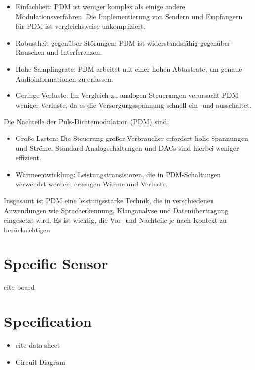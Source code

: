 \begin{itemize}
    \item Einfachheit: PDM ist weniger komplex als einige andere Modulationsverfahren. Die Implementierung von Sendern und Empfängern für PDM ist vergleichsweise unkompliziert.
    \item Robustheit gegenüber Störungen: PDM ist widerstandsfähig gegenüber Rauschen und Interferenzen.
    \item Hohe Samplingrate: PDM arbeitet mit einer hohen Abtastrate, um genaue Audioinformationen zu erfassen.
    \item Geringe Verluste: Im Vergleich zu analogen Steuerungen verursacht PDM weniger Verluste, da es die Versorgungsspannung schnell ein- und ausschaltet.
\end{itemize}

\bigskip

Die Nachteile der Puls-Dichtemodulation (PDM) sind:

\begin{itemize}
    \item Große Lasten: Die Steuerung großer Verbraucher erfordert hohe Spannungen und Ströme. Standard-Analogschaltungen und DACs sind hierbei weniger effizient.
    \item Wärmeentwicklung: Leistungstransistoren, die in PDM-Schaltungen verwendet werden, erzeugen Wärme und Verluste.
\end{itemize}

Insgesamt ist PDM eine leistungsstarke Technik, die in verschiedenen Anwendungen wie Spracherkennung, Klanganalyse und Datenübertragung eingesetzt wird. Es ist wichtig, die Vor- und Nachteile je nach Kontext zu berücksichtigen



\section{Specific Sensor}

cite board

\section{Specification}

\begin{itemize}
    \item cite data sheet
    \item Circuit Diagram
\end{itemize}



